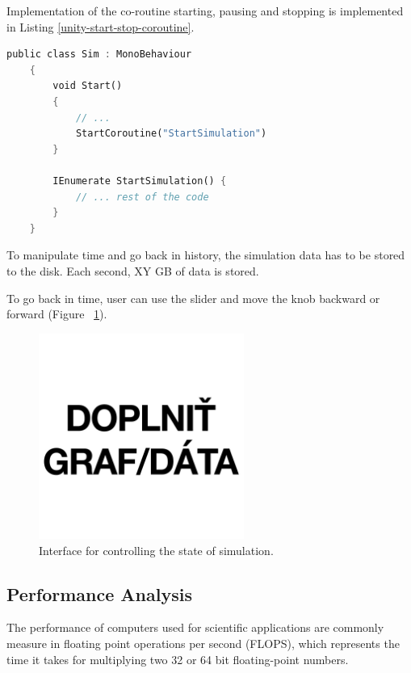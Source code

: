 Implementation of the co-routine starting, pausing and stopping is implemented in Listing \ref{unity-start-stop-coroutine}.

\begin{lstlisting}[language=Rust, caption="Starting\, pausing and stopping the co-routines in Unity.", label=unity-start-stop-coroutine]
	public class Sim : MonoBehaviour
	{
		void Start()
		{
			// ...
			StartCoroutine("StartSimulation")
		}
		
		IEnumerate StartSimulation() {
			// ... rest of the code
		}
	}
\end{lstlisting}

To manipulate time and go back in history, the simulation data has to be stored to the disk. Each second, XY GB of data is stored. 

To go back in time, user can use the slider and move the knob backward or forward (Figure~ \ref{fig:unity-time-manipulation}).

\begin{figure}[!ht]
	\centering
	\includegraphics[width=0.6\textwidth]{figures/empty.jpg}
	\caption{Interface for controlling the state of simulation.}
	\label{fig:unity-time-manipulation}
\end{figure}


\subsection{Performance Analysis}
The performance of computers used for scientific applications are commonly measure in floating point operations per second (FLOPS), which represents the time it takes for multiplying two 32 or 64 bit floating-point numbers.

